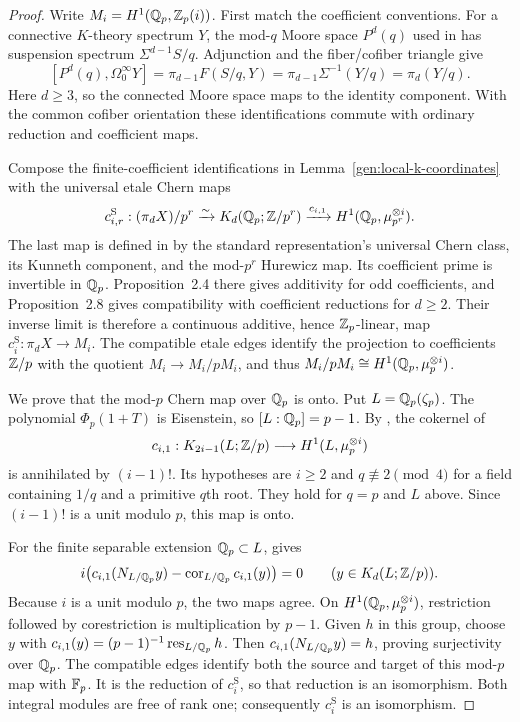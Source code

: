 \begin{proof}
Write $M_i=H^1(\mathbb Q_p,\mathbb Z_p(i))$.  First match the coefficient conventions.
For a connective $K$-theory spectrum $Y$, the mod-$q$ Moore space
$P^d(q)$ used in \cite[Section~1, Example~1.4]{WeibelEtaleChern}
has suspension spectrum $\Sigma^{d-1}S/q$.  Adjunction and the
fiber/cofiber triangle give
\[
 [P^d(q),\Omega^\infty_0Y]
 =\pi_{d-1}F(S/q,Y)
 =\pi_{d-1}\Sigma^{-1}(Y/q)
 =\pi_d(Y/q).
\]
Here $d\geq3$, so the connected Moore space maps to the identity
component.  With the common cofiber orientation these identifications
commute with ordinary reduction and coefficient maps.

Compose the finite-coefficient identifications in
Lemma~\ref{gen:local-k-coordinates} with the universal etale Chern maps
\[
 c_{i,r}^{\mathrm S}:(\pi_dX)/p^r
 \xrightarrow{\sim}K_d(\mathbb Q_p;\mathbb Z/p^r)
 \xrightarrow{c_{i,1}}H^1(\mathbb Q_p,\mu_{p^r}^{\otimes i}).
\]
The last map is defined in \cite[Section~2, equation~(2.1)]
{WeibelEtaleChern} by the standard representation's universal Chern
class, its Kunneth component, and the mod-$p^r$ Hurewicz map.
Its coefficient prime is invertible in $\mathbb Q_p$.  Proposition~2.4
there gives additivity for odd coefficients, and Proposition~2.8
gives compatibility with coefficient reductions for $d\geq2$.
Their inverse limit is therefore a continuous additive, hence
$\mathbb Z_p$-linear, map $c_i^{\mathrm S}:\pi_dX\to M_i$.
The compatible etale edges identify the projection to coefficients
$\mathbb Z/p$ with the quotient $M_i\to M_i/pM_i$, and thus
$M_i/pM_i\cong H^1(\mathbb Q_p,\mu_p^{\otimes i})$.

We prove that the mod-$p$ Chern map over $\mathbb Q_p$ is onto.  Put
$L=\mathbb Q_p(\zeta_p)$.  The polynomial $\Phi_p(1+T)$ is Eisenstein, so
$[L:\mathbb Q_p]=p-1$.  By \cite[Proposition~5.2]{WeibelEtaleChern}, the
cokernel of
\[
 c_{i,1}:K_{2i-1}(L;\mathbb Z/p)\longrightarrow
 H^1(L,\mu_p^{\otimes i})
\]
is annihilated by $(i-1)!$.  Its hypotheses are $i\geq2$ and
$q\not\equiv2\pmod4$ for a field containing $1/q$ and a primitive
$q$th root.  They hold for $q=p$ and $L$ above.  Since
$(i-1)!$ is a unit modulo $p$, this map is onto.

For the finite separable extension $\mathbb Q_p\subset L$,
\cite[Proposition~4.4]{WeibelEtaleChern} gives
\[
 i\bigl(c_{i,1}(N_{L/\mathbb Q_p}y)
  -\operatorname{cor}_{L/\mathbb Q_p}c_{i,1}(y)\bigr)=0
 \qquad (y\in K_d(L;\mathbb Z/p)).
\]
Because $i$ is a unit modulo $p$, the two maps agree.  On
$H^1(\mathbb Q_p,\mu_p^{\otimes i})$, restriction followed by corestriction
is multiplication by $p-1$.  Given $h$ in this group, choose $y$ with
$c_{i,1}(y)=(p-1)^{-1}\operatorname{res}_{L/\mathbb Q_p}h$.
Then $c_{i,1}(N_{L/\mathbb Q_p}y)=h$, proving surjectivity over $\mathbb Q_p$.
The compatible edges identify both the source and target of this
mod-$p$ map with $\mathbb F_p$.  It is the reduction of $c_i^{\mathrm S}$,
so that reduction is an isomorphism.  Both integral modules are
free of rank one; consequently $c_i^{\mathrm S}$ is an isomorphism.


\end{proof}

